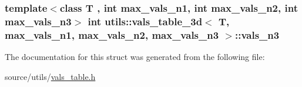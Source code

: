 \hypertarget{structutils_1_1vals__table__3d_a7b637c7958c882759e6b8863793f4673}{
\subsubsection[{vals\-\_\-n3}]{\setlength{\rightskip}{0pt plus 5cm}template$<$class T , int max\-\_\-vals\-\_\-n1, int max\-\_\-vals\-\_\-n2, int max\-\_\-vals\-\_\-n3$>$ {\bf int} {\bf utils\-::vals\-\_\-table\-\_\-3d}$<$ T, max\-\_\-vals\-\_\-n1, max\-\_\-vals\-\_\-n2, max\-\_\-vals\-\_\-n3 $>$\-::vals\-\_\-n3}}\label{structutils_1_1vals__table__3d_a7b637c7958c882759e6b8863793f4673}


The documentation for this struct was generated from the following file\-:\begin{DoxyCompactItemize}
\item 
source/utils/\hyperlink{vals__table_8h}{vals\-\_\-table.\-h}\end{DoxyCompactItemize}
